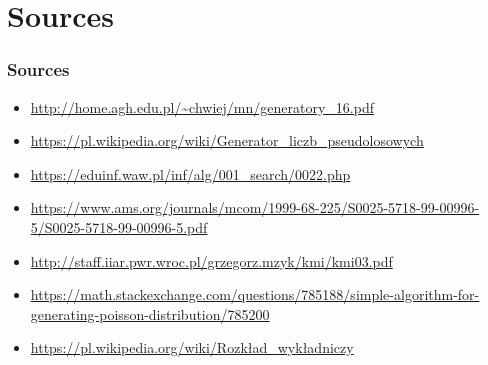 \documentclass[9pt]{beamer}
\begin{document}
\section{Sources}
\begin{frame}
  \frametitle{Sources}
  \begin{itemize}
    \item \url{http://home.agh.edu.pl/~chwiej/mn/generatory_16.pdf}
    \item \url{https://pl.wikipedia.org/wiki/Generator_liczb_pseudolosowych}
    \item \url{https://eduinf.waw.pl/inf/alg/001_search/0022.php}
    \item \url{https://www.ams.org/journals/mcom/1999-68-225/S0025-5718-99-00996-5/S0025-5718-99-00996-5.pdf}
    \item \url{http://staff.iiar.pwr.wroc.pl/grzegorz.mzyk/kmi/kmi03.pdf}
    \item \url{https://math.stackexchange.com/questions/785188/simple-algorithm-for-generating-poisson-distribution/785200}
    \item \url{https://pl.wikipedia.org/wiki/Rozkład_wykładniczy}
  \end{itemize}
\end{frame}
\end{document}
